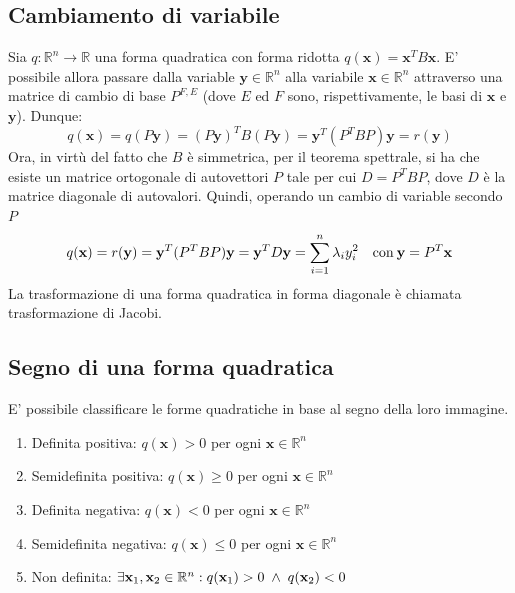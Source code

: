 \vspace{10pt}
\subsection{Cambiamento di variabile} \label{subsec:quadformchange}
    Sia $q: \mathbb{R}^{n} \rightarrow \mathbb{R}$ una forma quadratica con forma ridotta $q(\mathbf{x}) = \mathbf{x}^{T} B \mathbf{x}$. E' possibile allora passare dalla variable $\mathbf{y} \in \mathbb{R}^{n}$ alla variabile $\mathbf{x} \in \mathbb{R}^{n}$
    attraverso una matrice di cambio di base $P^{F, E}$ (dove $E$ ed $F$ sono, rispettivamente, le basi di $\mathbf{x}$ e $\mathbf{y}$). Dunque:
    \[
        q(\mathbf{x}) = q(P \mathbf{y}) = (P \mathbf{y})^{T} B (P \mathbf{y}) = \mathbf{y}^T (P^T B P) \mathbf{y} = r(\mathbf{y})
    \]
    Ora, in virtù del fatto che $B$ è simmetrica, per il teorema spettrale, si ha che esiste un matrice ortogonale di autovettori $P$ tale per cui $D = P^{T} B P$, dove $D$ è la matrice diagonale di autovalori. Quindi, operando un cambio di variable secondo $P$
    \[
        q(\mathbf{x}) = r(\mathbf{y}) = \mathbf{y}^{T} (P^T B P) \mathbf{y} = \mathbf{y}^{T} D \mathbf{y} = \sum_{i = 1}^{n} \lambda_i y_i^2  \quad \textnormal{con} \: \mathbf{y} = P^{T} \mathbf{x}
    \]
    La trasformazione di una forma quadratica in forma diagonale è chiamata trasformazione di Jacobi.



\vspace{10pt}
\subsection{Segno di una forma quadratica} \label{subsec:quadformsign}
    E' possibile classificare le forme quadratiche in base al segno della loro immagine.
    \begin{enumerate}[label=(\arabic*)]
        \item Definita positiva: $q(\mathbf{x}) > 0$ per ogni $\mathbf{x} \in \mathbb{R}^{n}$
        \item Semidefinita positiva: $q(\mathbf{x}) \geq 0$ per ogni $\mathbf{x} \in \mathbb{R}^{n}$
        \item Definita negativa: $q(\mathbf{x}) < 0$ per ogni $\mathbf{x} \in \mathbb{R}^{n}$
        \item Semidefinita negativa: $q(\mathbf{x}) \leq 0$ per ogni $\mathbf{x} \in \mathbb{R}^{n}$
        \item Non definita: $\exists \mathbf{x}_{1}, \mathbf{x}_{2} \in \mathbb{R}^{n} \mathrel{:} q(\mathbf{x}_{1}) > 0 \; \land \; q(\mathbf{x}_{2}) < 0$
    \end{enumerate}

